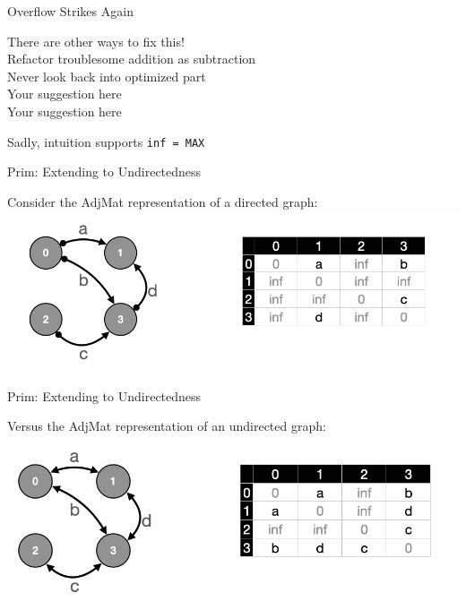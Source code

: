 \documentclass[usenames, xcolor=dvipsnames]{beamer}
\begin{document}
\begin{frame}{Overflow Strikes Again}

There are other ways to fix this!
\\ \pause \hspace{1em} Refactor troublesome addition as subtraction
\\ \pause \hspace{1em} Never look back into optimized part
\\ \pause \hspace{1em} Your suggestion here
\\ \pause \hspace{1em} Your suggestion here

\bigskip

\pause Sadly, intuition supports \texttt{inf = MAX}

\end{frame}


\begin{frame}{Prim: Extending to Undirectedness}

Consider the AdjMat representation of a directed graph: \\
\centering
\includegraphics[scale=0.7]{directed}

\end{frame}

\begin{frame}{Prim: Extending to Undirectedness}

Versus the AdjMat representation of an undirected graph: \\
\centering
\includegraphics[scale=0.7]{undirected}

\end{frame}
\end{document}
